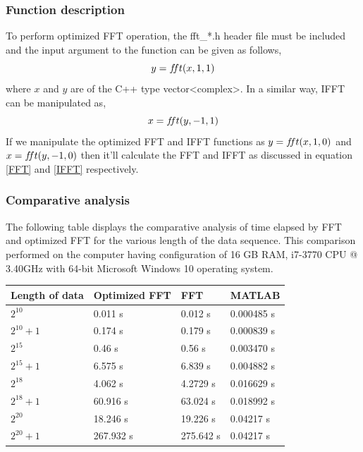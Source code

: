 \begin{refsection}
\subsubsection{Function description}
To perform optimized FFT operation, the fft\_*.h header file must be included and the input argument to the function can be given as follows,
\begin{equation*}
	y=f\hspace{-0.85mm}ft(x,1,1)
\end{equation*}
where $x$ and $y$ are of the C++ type vector<complex>. In a similar way, IFFT can be manipulated as,
\begin{equation*}
	x=f\hspace{-0.85mm}ft(y,-1,1)
\end{equation*}
If we manipulate the optimized FFT and IFFT functions as $y=f\hspace{-0.85mm}ft(x,1,0)$ and  $x=f\hspace{-0.85mm}ft(y,-1,0)$ then it'll calculate the FFT and IFFT as discussed in equation \ref{FFT} and \ref{IFFT} respectively.
\subsubsection{Comparative analysis }
The following table displays the comparative analysis of time elapsed by FFT and optimized FFT for the various length of the data sequence. This comparison performed on the computer having configuration of 16 GB RAM, i7-3770 CPU @ 3.40GHz with 64-bit Microsoft Windows 10 operating system.
\begin{center}
	\begin{tabular}{ |p{4cm}||p{3cm}|p{3cm}|p{3cm}|   }
		\hline
		\centering \textbf{Length of data} & \textbf{Optimized FFT}& \textbf{FFT}&\textbf{MATLAB}\\
		\hline
		\hline
		\centering \textbf{$2^{10}$}   & 0.011 s  & 0.012 s & 0.000485 s\\
		\hline
		\centering \textbf{$2^{10}+1$} & 0.174 s  & 0.179 s & 0.000839 s\\
		\hline
		\centering \textbf{$2^{15}$}   & 0.46 s   & 0.56 s  & 0.003470 s\\
		\hline
		\centering \textbf{$2^{15}+1$} & 6.575 s  & 6.839 s & 0.004882 s\\
		\hline
		\centering \textbf{$2^{18}$}   & 4.062 s  & 4.2729 s& 0.016629 s \\
		\hline
		\centering \textbf{$2^{18}+1$} & 60.916 s & 63.024 s& 0.018992 s\\
		\hline
		\centering \textbf{$2^{20}$}   & 18.246 s & 19.226 s&  0.04217 s\\
		\hline
		\centering \textbf{$2^{20}+1$} & 267.932 s & 275.642 s & 0.04217 s \\
		\hline
	\end{tabular}
\end{center}




\clearpage
\printbibliography[heading=subbibliography]
\end{refsection}
\cleardoublepage


